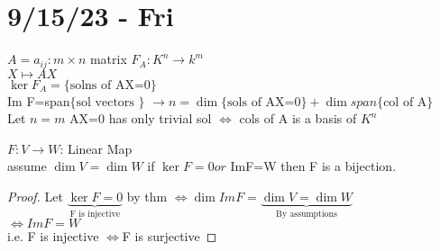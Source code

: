 \documentclass{article}
\newcommand{\mn}{m \times n}
\newcommand{\brac}[1]{\{#1\}}
\begin{document}
\section{9/15/23 - Fri}

$A={a}_{ij}: \mn$ matrix
$F_A:K^n \to k^m$\\
$X \mapsto AX$\\
$\ker F_A=\brac{\text{solns of AX=0}}$
\\Im F=span$ \brac{\text{sol vectors }}$
$\to n =\dim \brac{\text{sols of AX=0}}+\dim span\brac{\text{col of A}}$\\
Let $n=m$ AX=0 has only trivial sol $\iff$ cols of A is a basis of $K^n$
\begin{theorem}
    $F: V\to W $: Linear Map \\ assume $\dim V =\dim W$ if $\ker F=0 or $ ImF=W then F is a bijection.
    
\end{theorem}
\begin{proof}
   
    Let $\underbrace{\ker F =0}_{\text{F is injective}}$ by thm $\iff \dim Im F=\underbrace{\dim V=\dim W }_{\text{By assumptions}}$
    \\ $\iff ImF=W$\\
    i.e. F is injective $\iff $F is surjective
    
    
\end{proof}
\end{document}
